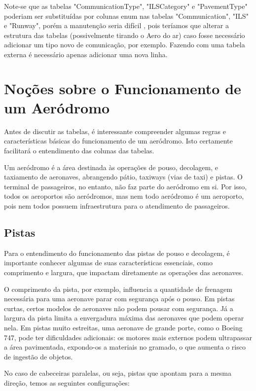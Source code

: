 Note-se que as tabelas "CommunicationType", "ILSCategory" e "PavementType" poderiam 
ser substituídas por colunas enum nas tabelas "Communication", "ILS" e "Runway", 
porém a manutenção seria difícil \cite{table-enum}, pois teríamos que alterar a 
estrutura das tabelas (possivelmente tirando o Aero do ar) caso fosse necessário 
adicionar um tipo novo de comunicação, por exemplo. Fazendo com uma tabela externa 
é necessário apenas adicionar uma nova linha.

\section{Noções sobre o Funcionamento de um Aeródromo}

Antes de discutir as tabelas, é interessante compreender algumas regras e 
características básicas do funcionamento de um aeródromo. Isto certamente
facilitará o entendimento das colunas das tabelas.

Um aeródromo é a área destinada às operações de pouso, decolagem, e taxiamento 
de aeronaves, abrangendo pátio, taxiways (vias de taxi) e pistas. O terminal de 
passageiros, no entanto, não faz parte do aeródromo em si. Por isso, todos os 
aeroportos são aeródromos, mas nem todo aeródromo é um aeroporto, pois nem todos 
possuem infraestrutura para o atendimento de passageiros.

\subsection{Pistas}

Para o entendimento do funcionamento das pistas de pouso e decolagem, é importante 
conhecer algumas de suas características essenciais, como comprimento e largura, 
que impactam diretamente as operações das aeronaves.

O comprimento da pista, por exemplo, influencia a quantidade de frenagem necessária 
para uma aeronave parar com segurança após o pouso. Em pistas curtas, certos 
modelos de aeronaves não podem pousar com segurança. Já a largura da pista limita 
a envergadura máxima das aeronaves que podem operar nela. Em pistas muito estreitas, 
uma aeronave de grande porte, como o Boeing 747, pode ter dificuldades adicionais: 
os motores mais externos podem ultrapassar a área pavimentada, expondo-os a 
materiais no gramado, o que aumenta o risco de ingestão de objetos.

No caso de cabeceiras paralelas, ou seja, pistas que apontam para a mesma direção, 
temos as seguintes configurações:

